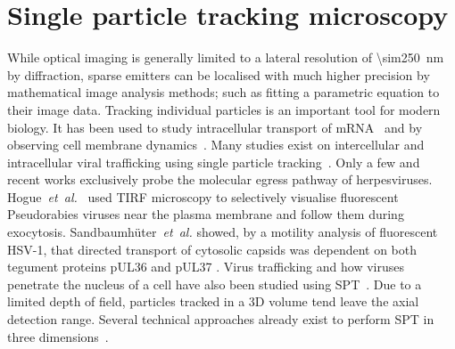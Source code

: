 \section{Single particle tracking microscopy}

While optical imaging is generally limited to a lateral resolution of \SI{\sim250}{\nano\metre} by diffraction, sparse emitters can be localised with much higher precision by mathematical image analysis methods; such as fitting a parametric equation to their image data.
Tracking individual particles is an important tool for modern biology.
It has been used to study intracellular transport of mRNA~\cite{Spille2015a} and by observing cell membrane dynamics~\cite{Cognet2014}.
Many studies exist on intercellular and intracellular viral trafficking
using single particle tracking~\cite{(reviewed in [43])}.
Only a few and recent works exclusively probe the molecular egress pathway of herpesviruses.
Hogue~\emph{et~al.}~\cite{[16]} used \gls{TIRF} microscopy to selectively visualise fluorescent Pseudorabies viruses near the plasma membrane and follow them during exocytosis.
Sandbaumhüter~\emph{et~al.} showed, by a motility analysis of fluorescent \gls{HSV}-1, that directed transport of cytosolic capsids was dependent on both tegument proteins pUL36 and pUL37 \cite{[44]}.
Virus trafficking and how viruses penetrate the nucleus of a cell have also been studied using \gls{SPT}~\cite{Brandenburg2007}.
Due to a limited depth of field, particles tracked in a \gls{3D} volume tend leave the axial detection range.
Several technical approaches already exist to perform \gls{SPT} in three dimensions~\cite{[46-49]}.

